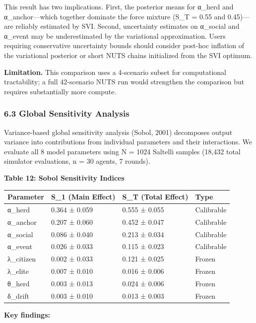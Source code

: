 \documentclass[
]{article}
\begin{document}
This result has two implications. First, the posterior means for α\_herd
and α\_anchor---which together dominate the force mixture (S\_T = 0.55
and 0.45)---are reliably estimated by SVI. Second, uncertainty estimates
on α\_social and α\_event may be underestimated by the variational
approximation. Users requiring conservative uncertainty bounds should
consider post-hoc inflation of the variational posterior or short NUTS
chains initialized from the SVI optimum.

\textbf{Limitation.} This comparison uses a 4-scenario subset for
computational tractability; a full 42-scenario NUTS run would strengthen
the comparison but requires substantially more compute.

\subsubsection{6.3 Global Sensitivity
Analysis}\label{global-sensitivity-analysis}

Variance-based global sensitivity analysis (Sobol, 2001) decomposes
output variance into contributions from individual parameters and their
interactions. We evaluate all 8 model parameters using N = 1024 Saltelli
samples (18,432 total simulator evaluations, n = 30 agents, 7 rounds).

\textbf{Table 12: Sobol Sensitivity Indices}

\begin{longtable}[]{@{}llll@{}}
\toprule\noalign{}
Parameter & S\_1 (Main Effect) & S\_T (Total Effect) & Type \\
\midrule\noalign{}
\endhead
\bottomrule\noalign{}
\endlastfoot
α\_herd & 0.364 ± 0.059 & 0.555 ± 0.055 & Calibrable \\
α\_anchor & 0.207 ± 0.060 & 0.452 ± 0.047 & Calibrable \\
α\_social & 0.086 ± 0.040 & 0.213 ± 0.034 & Calibrable \\
α\_event & 0.026 ± 0.033 & 0.115 ± 0.023 & Calibrable \\
λ\_citizen & 0.002 ± 0.033 & 0.121 ± 0.025 & Frozen \\
λ\_elite & 0.007 ± 0.010 & 0.016 ± 0.006 & Frozen \\
θ\_herd & 0.003 ± 0.013 & 0.024 ± 0.006 & Frozen \\
δ\_drift & 0.003 ± 0.010 & 0.013 ± 0.003 & Frozen \\
\end{longtable}

\textbf{Key findings:}
\end{document}
